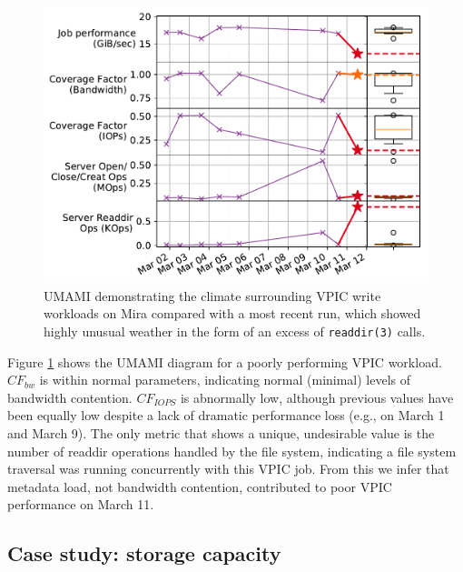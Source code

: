 {\begin{figure}[t]
    \centering
    \includegraphics[width=1.0\columnwidth]{figs/umami-mira-fs1-vpic-write.pdf}
    \vspace{-.35in}
    \caption{UMAMI demonstrating the climate surrounding VPIC write workloads on Mira compared with a most recent run, which showed highly unusual weather in the form of an excess of \texttt{readdir(3)} calls.
    }
    \label{fig:umami-mira-fs1-vpic-write}
    \vspace{-.15in}
\end{figure}

Figure \ref{fig:umami-mira-fs1-vpic-write} shows the UMAMI diagram for a poorly performing VPIC workload.
$\mathit{CF}_{\mathit{bw}}$ is within normal parameters, indicating normal (minimal) levels of bandwidth contention.
$\mathit{CF}_{\mathit{IOPS}}$ is abnormally low, although previous values have been equally low despite a lack of dramatic performance loss (e.g., on March 1 and March 9).
The only metric that shows a unique, undesirable value is the number of readdir operations handled by the file system, indicating a file system traversal was running concurrently with this VPIC job.
From this we infer that metadata load, not bandwidth contention, contributed to poor VPIC performance on March 11.

\subsection{Case study: storage capacity}

}
